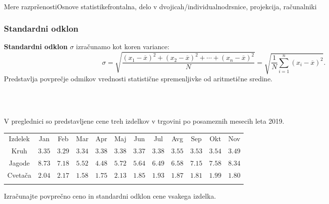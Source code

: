 \begin{priprava}{4}{}{Mere razpršenosti}{Osnove statistike}{frontalna, delo v dvojicah/individualno}{drsnice, projekcija, računalniki}
% 
% 

\subsubsection{Standardni odklon}
    \textbf{Standardni odklon} $\sigma$ izračunamo kot koren variance:
    $$\sigma=\sqrt{\dfrac{(x_1-\overline{x})^2+(x_2-\overline{x})^2+\cdots+(x_n-\overline{x})^2}{N}}=\sqrt{\dfrac{1}{N}\sum_{i=1}^n(x_i-\overline{x})^2}.$$
    Predstavlja povprečje odmikov vrednosti statistične spremenljivke od aritmetične sredine.


~\\~




\begin{naloga}
 
    V preglednici so predstavljene cene treh izdelkov v trgovini po posameznih mesecih leta 2019. 

     \begin{table}[H]
         \centering
         \begin{tabular}{||c|c|c|c|c|c|c|c|c|c|c|c||} 
         \hhline{|t:============:t|}
         \rowcolor[rgb]{0.843,0.718,0.718} 
         Izdelek  & Jan & Feb & Mar & Apr & Maj & Jun & Jul & Avg & Sep & Okt & Nov    \\ 
         \hhline{|:============:|}
         Kruh  & $3.35$ & $3.29$ & $3.34$ & $3.38$ & $3.38$ & $3.37$ & $3.38$ & $3.55$ & $3.53$ & $3.54$ & $3.49$ \\ 
         \hhline{|:============:|}
         Jagode & $8.73$ & $7.18$ & $5.52$ & $4.48$ & $5.72$ & $5.64$ & $6.49$ & $6.58$ & $7.15$ & $7.58$ & $8.34$ \\ 
         \hhline{|:============:|}
         Cvetača & $2.04$ & $2.17$ & $1.58$ & $1.75$ & $2.13$ & $1.85$ & $1.93$ & $1.87$ & $1.81$ & $1.99$ & $1.80$ \\ 
         \hhline{|b:============:b|}
         \end{tabular}
     \end{table}

     Izračunajte povprečno ceno in standardni odklon cene vsakega izdelka.

 
    \end{naloga}





\begin{naloga}


\end{naloga}
\end{priprava}
